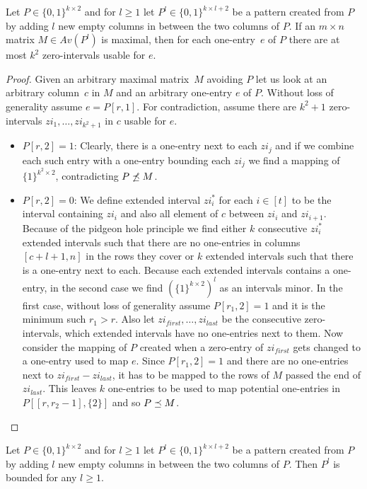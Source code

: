 \begin{lemma}
\label{lemma:twocols2}
Let $P\in\{0,1\}^{k\times 2}$ and for $l\geq1$ let $P^l\in\{0,1\}^{k\times l+2}$ be a pattern created from $P$ by adding $l$ new empty columns in between the two columns of $P$. If an $m\times n$ matrix $M\in Av(P^l)$ is maximal, then for each one-entry~$e$ of $P$ there are at most $k^2$ zero-intervals usable for $e$.
\end{lemma}
\begin{proof}
Given an arbitrary maximal matrix~$M$ avoiding $P$ let us look at an arbitrary column~$c$ in $M$ and an arbitrary one-entry $e$ of $P$. Without loss of generality assume $e=P[r,1]$. For contradiction, assume there are $k^2+1$ zero-intervals $zi_1,\dots,zi_{k^2+1}$ in $c$ usable for $e$.
\begin{itemize}
	\item $P[r,2]=1$: Clearly, there is a one-entry next to each $zi_j$ and if we combine each such entry with a one-entry bounding each $zi_j$ we find a mapping of $\{1\}^{k^2\times2}$, contradicting $P\not\preceq M$.
	\item $P[r,2]=0$: We define extended interval $zi^*_i$ for each $i\in[t]$ to be the interval containing $zi_i$ and also all element of $c$ between $zi_i$ and $zi_{i+1}$. Because of the pidgeon hole principle we find either $k$ consecutive $zi^*_i$ extended intervals such that there are no one-entries in columns $[c+l+1,n]$ in the rows they cover or $k$ extended intervals such that there is a one-entry next to each. Because each extended intervals contains a one-entry, in the second case we find $\left(\{1\}^{k\times2}\right)^l$ as an intervals minor. In the first case, without loss of generality assume $P[r_1,2]=1$ and it is the minimum such $r_1>r$. Also let $zi_{first},\dots,zi_{last}$ be the consecutive zero-intervals, which extended intervals have no one-entries next to them. Now consider the mapping of $P$ created when a zero-entry of $zi_{first}$ gets changed to a one-entry used to map $e$. Since $P[r_1,2]=1$ and there are no one-entries next to $zi_{first}-zi_{last}$, it has to be mapped to the rows of $M$ passed the end of $zi_{last}$. This leaves $k$ one-entries to be used to map potential one-entries in $P[[r,r_2-1],\{2\}]$ and so $P\preceq M$.
\end{itemize}
\end{proof}

\begin{cor}
Let $P\in\{0,1\}^{k\times 2}$ and for $l\geq1$ let $P^l\in\{0,1\}^{k\times l+2}$ be a pattern created from $P$ by adding $l$ new empty columns in between the two columns of $P$. Then $P^l$ is bounded for any $l\geq1$.
\end{cor}

